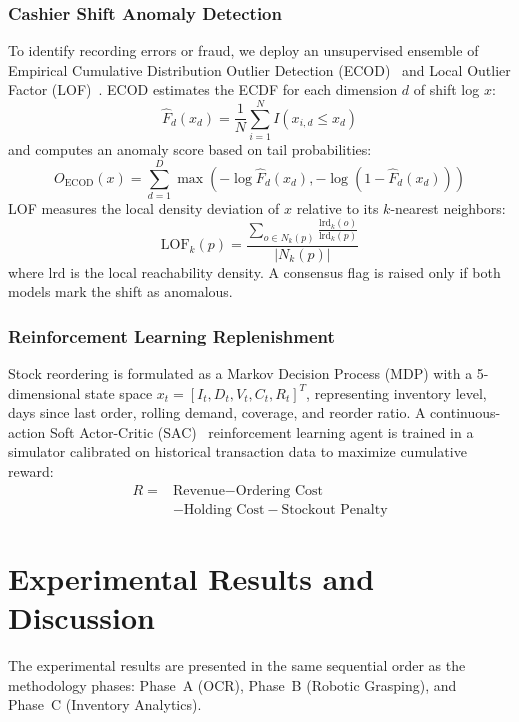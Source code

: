 \documentclass[conference]{IEEEtran}
\begin{document}
\subsubsection{Cashier Shift Anomaly Detection}
To identify recording errors or fraud, we deploy an unsupervised ensemble of Empirical Cumulative Distribution Outlier Detection (ECOD)~\cite{ecod} and Local Outlier Factor (LOF)~\cite{lof}. 
ECOD estimates the ECDF for each dimension $d$ of shift log $x$:
\begin{equation}
\hat{F}_d(x_d) = \frac{1}{N} \sum_{i=1}^{N} I(x_{i,d} \le x_d)
\end{equation}
and computes an anomaly score based on tail probabilities:
\begin{equation}
O_{\text{ECOD}}(x) = \sum_{d=1}^{D} \max\left(-\log \hat{F}_d(x_d), -\log(1 - \hat{F}_d(x_d))\right)
\end{equation}
LOF measures the local density deviation of $x$ relative to its $k$-nearest neighbors:
\begin{equation}
\text{LOF}_k(p) = \frac{\sum_{o \in N_k(p)} \frac{\text{lrd}_k(o)}{\text{lrd}_k(p)}}{|N_k(p)|}
\end{equation}
where $\text{lrd}$ is the local reachability density. A consensus flag is raised only if both models mark the shift as anomalous.

\subsubsection{Reinforcement Learning Replenishment}
Stock reordering is formulated as a Markov Decision Process (MDP) with a 5-dimensional state space $x_t = [I_t, D_t, V_t, C_t, R_t]^T$, representing inventory level, days since last order, rolling demand, coverage, and reorder ratio. A continuous-action Soft Actor-Critic (SAC)~\cite{sac} reinforcement learning agent is trained in a simulator calibrated on historical transaction data to maximize cumulative reward:
\begin{equation}
\begin{split}
R = {} & \text{Revenue} - \text{Ordering Cost} \\
       & - \text{Holding Cost} - \text{Stockout Penalty}
\end{split}
\end{equation}

\section{Experimental Results and Discussion}
The experimental results are presented in the same sequential order as the methodology phases: Phase~A (OCR), Phase~B (Robotic Grasping), and Phase~C (Inventory Analytics).
\end{document}
